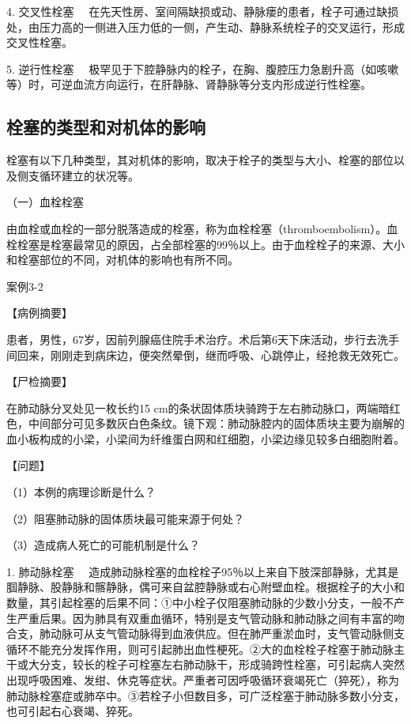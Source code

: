 {4. 交叉性栓塞}
　在先天性房、室间隔缺损或动、静脉瘘的患者，栓子可通过缺损处，由压力高的一侧进入压力低的一侧，产生动、静脉系统栓子的交叉运行，形成交叉性栓塞。

{5. 逆行性栓塞}
　极罕见于下腔静脉内的栓子，在胸、腹腔压力急剧升高（如咳嗽等）时，可逆血流方向运行，在肝静脉、肾静脉等分支内形成逆行性栓塞。

\subsection{栓塞的类型和对机体的影响}

栓塞有以下几种类型，其对机体的影响，取决于栓子的类型与大小、栓塞的部位以及侧支循环建立的状况等。

{（一）血栓栓塞}

由血栓或血栓的一部分脱落造成的栓塞，称为血栓栓塞（thromboembolism）。血栓栓塞是栓塞最常见的原因，占全部栓塞的99％以上。由于血栓栓子的来源、大小和栓塞部位的不同，对机体的影响也有所不同。

\begin{framed}
{案例3-2}

{【病例摘要】}

患者，男性，67岁，因前列腺癌住院手术治疗。术后第6天下床活动，步行去洗手间回来，刚刚走到病床边，便突然晕倒，继而呼吸、心跳停止，经抢救无效死亡。

{【尸检摘要】}

在肺动脉分叉处见一枚长约15
cm的条状固体质块骑跨于左右肺动脉口，两端暗红色，中间部分可见多数灰白色条纹。镜下观：肺动脉腔内的固体质块主要为崩解的血小板构成的小梁，小梁间为纤维蛋白网和红细胞，小梁边缘见较多白细胞附着。

{【问题】}

（1）本例的病理诊断是什么？

（2）阻塞肺动脉的固体质块最可能来源于何处？

（3）造成病人死亡的可能机制是什么？
\end{framed}

{1. 肺动脉栓塞}
　造成肺动脉栓塞的血栓栓子95％以上来自下肢深部静脉，尤其是腘静脉、股静脉和髂静脉，偶可来自盆腔静脉或右心附壁血栓。根据栓子的大小和数量，其引起栓塞的后果不同：①中小栓子仅阻塞肺动脉的少数小分支，一般不产生严重后果。因为肺具有双重血循环，特别是支气管动脉和肺动脉之间有丰富的吻合支，肺动脉可从支气管动脉得到血液供应。但在肺严重淤血时，支气管动脉侧支循环不能充分发挥作用，则可引起肺出血性梗死。②大的血栓栓子栓塞于肺动脉主干或大分支，较长的栓子可栓塞左右肺动脉干，形成骑跨性栓塞，可引起病人突然出现呼吸困难、发绀、休克等症状。严重者可因呼吸循环衰竭死亡（猝死），称为肺动脉栓塞症或肺卒中。③若栓子小但数目多，可广泛栓塞于肺动脉多数小分支，也可引起右心衰竭、猝死。

